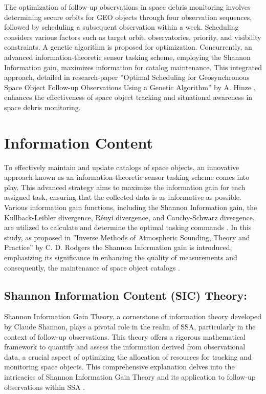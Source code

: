 The optimization of follow-up observations in space debris monitoring involves determining secure orbits for GEO objects through four observation sequences, followed by scheduling a subsequent observation within a week. Scheduling considers various factors such as target orbit, observatories, priority, and visibility constraints. A genetic algorithm is proposed for optimization. Concurrently, an advanced information-theoretic sensor tasking scheme, employing the Shannon Information gain, maximizes information for catalog maintenance. This integrated approach, detailed in research-paper ''Optimal Scheduling for Geosynchronous Space Object Follow-up Observations Using a
Genetic Algorithm'' by A. Hinze \cite{hinze1}, enhances the effectiveness of space object tracking and situational awareness in space debris monitoring.

\section{Information Content}

To effectively maintain and update catalogs of space objects, an innovative approach known as an information-theoretic sensor tasking scheme comes into play. This advanced strategy aims to maximize the information 
gain for each assigned task, ensuring that the collected data is as informative as possible. Various information gain functions, including the Shannon Information gain, the Kullback-Leibler divergence, Rényi divergence, and Cauchy-Schwarz divergence, 
are utilized to calculate and determine the optimal tasking commands \cite{nsga}. In this study, as proposed in ''Inverse Methods of Atmospheric Sounding, Theory and Practice'' by C. D. Rodgers \cite{IC,hinze1} the Shannon Information gain is introduced, emphasizing its significance in enhancing the quality of measurements and consequently, 
the maintenance of space object catalogs \cite{hinze1}.\\

\subsection{Shannon Information Content (SIC) Theory:}
Shannon Information Gain Theory, a cornerstone of information theory developed by Claude Shannon, plays a pivotal role in the realm of SSA, particularly in the context of follow-up observations. 
This theory offers a rigorous mathematical framework to quantify and assess the information derived from observational data, a crucial aspect of optimizing the allocation of resources for tracking and monitoring space objects. 
This comprehensive explanation delves into the intricacies of Shannon Information Gain Theory and its application to follow-up observations within SSA \cite{hinze1}.\\

